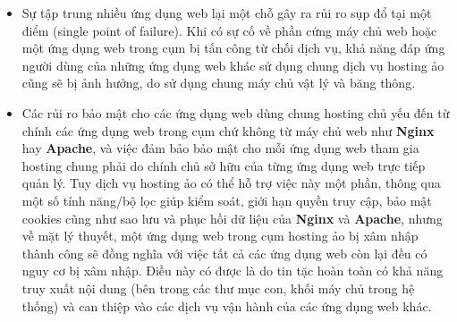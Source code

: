 \begin{itemize}
    \item Sự tập trung nhiều ứng dụng web lại một chỗ gây ra rủi ro sụp đổ tại một điểm (single point of failure). Khi có sự cố về phần cứng máy chủ web hoặc một ứng dụng web trong cụm bị tấn công từ chối dịch vụ, khả năng đáp ứng người dùng của những ứng dụng web khác sử dụng chung dịch vụ hosting ảo cũng sẽ bị ảnh hưởng, do sử dụng chung máy chủ vật lý và băng thông. 
    \item Các rủi ro bảo mật cho các ứng dụng web dùng chung hosting chủ yếu đến từ chính các ứng dụng web trong cụm chứ không từ máy chủ web như \textbf{Nginx} hay \textbf{Apache}, và việc đảm bảo bảo mật cho mỗi ứng dụng web tham gia hosting chung phải do chính chủ sở hữu của từng ứng dụng web trực tiếp quản lý. Tuy dịch vụ hosting ảo có thể hỗ trợ việc này một phần, thông qua một số tính năng/bộ lọc giúp kiểm soát, giới hạn quyền truy cập, bảo mật cookies cũng như sao lưu và phục hồi dữ liệu của \textbf{Nginx} và \textbf{Apache}, nhưng về mặt lý thuyết, một ứng dụng web trong cụm hosting ảo bị xâm nhập thành công sẽ đồng nghĩa với việc tất cả các ứng dụng web còn lại đều có nguy cơ bị xâm nhập. Điều này có được là do tin tặc hoàn toàn có khả năng truy xuất nội dung (bên trong các thư mục con, khối máy chủ trong hệ thống) và can thiệp vào các dịch vụ vận hành của các ứng dụng web khác.
\end{itemize}
